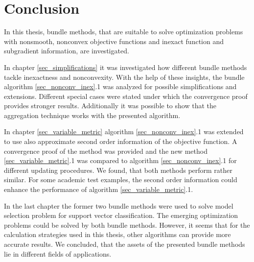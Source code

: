 
\section{Conclusion}

In this thesis, bundle methods, that are suitable to solve optimization problems with nonsmooth, nonconvex objective functions and inexact function and subgradient information, are investigated.

In chapter \ref{sec_simplifications} it was investigated how different bundle methods tackle inexactness and nonconvexity. With the help of these insights, the bundle algorithm \ref{sec_nonconv_inex}.1 was analyzed for possible simplifications and extensions. Different special cases were stated under which the convergence proof provides stronger results.
Additionally it was possible to show that the aggregation technique works with the presented algorithm.

In chapter \ref{sec_variable_metric} algorithm \ref{sec_nonconv_inex}.1 was extended to use also approximate second order information of the objective function. A convergence proof of the method was provided and the new method \ref{sec_variable_metric}.1 was compared to algorithm \ref{sec_nonconv_inex}.1 for different updating procedures. 
We found, that both methods perform rather similar. For some academic test examples, the second order information could enhance the performance of algorithm \ref{sec_variable_metric}.1.

In the last chapter the former two bundle methods were used to solve model selection problem for support vector classification.
The emerging optimization problems could be solved by both bundle methods. However, it seems that for the calculation strategies used in this thesis, other algorithms can provide more accurate results.
We concluded, that the assets of the presented bundle methods lie in different fields of applications.
